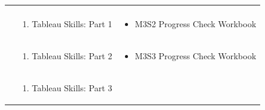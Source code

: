 \documentclass[
]{book}
\providecommand{\tightlist}{%
  \setlength{\itemsep}{0pt}\setlength{\parskip}{0pt}}
\begin{document}
\begin{longtable}[]{@{}lll@{}}
\begin{minipage}[t]{0.42\columnwidth}
\end{minipage}\tabularnewline
\begin{minipage}[t]{0.15\columnwidth}\raggedright
\strut
\end{minipage} & \begin{minipage}[t]{0.34\columnwidth}\raggedright
\begin{enumerate}
\def\labelenumi{\arabic{enumi}.}
\setcounter{enumi}{1}
\tightlist
\item
  Tableau Skills: Part 1
\end{enumerate}\strut
\end{minipage} & \begin{minipage}[t]{0.42\columnwidth}\raggedright
\begin{itemize}
\tightlist
\item
  M3S2 Progress Check Workbook
\end{itemize}\strut
\end{minipage}\tabularnewline
\begin{minipage}[t]{0.15\columnwidth}\raggedright
\strut
\end{minipage} & \begin{minipage}[t]{0.34\columnwidth}\raggedright
\begin{enumerate}
\def\labelenumi{\arabic{enumi}.}
\setcounter{enumi}{2}
\tightlist
\item
  Tableau Skills: Part 2
\end{enumerate}\strut
\end{minipage} & \begin{minipage}[t]{0.42\columnwidth}\raggedright
\begin{itemize}
\tightlist
\item
  M3S3 Progress Check Workbook
\end{itemize}\strut
\end{minipage}\tabularnewline
\begin{minipage}[t]{0.15\columnwidth}\raggedright
\strut
\end{minipage} & \begin{minipage}[t]{0.34\columnwidth}\raggedright
\begin{enumerate}
\def\labelenumi{\arabic{enumi}.}
\setcounter{enumi}{3}
\tightlist
\item
  Tableau Skills: Part 3
\end{enumerate}\strut
\end{minipage} & \begin{minipage}[t]{0.42\columnwidth}\raggedright
\begin{itemize}

\end{itemize}
\end{minipage}
\end{longtable}
\end{document}
